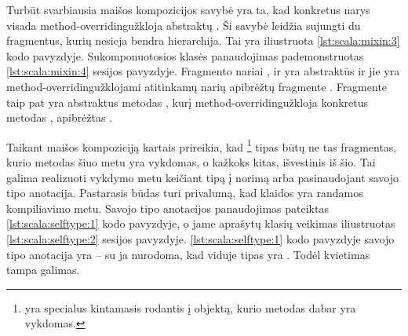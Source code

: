 
Turbūt svarbiausia maišos kompozicijos savybė yra ta, kad konkretus
narys visada \gls{method-overriding}{užkloja} abstraktų
\cite[6]{scalable-component-abstractions}. Ši savybė leidžia
sujungti du fragmentus, kurių nesieja bendra hierarchija. Tai yra
iliustruota \ref{lst:scala:mixin:3} kodo pavyzdyje.
Sukomponuotosios klasės  panaudojimas
pademonstruotas \ref{lst:scala:mixin:4}  sesijos
pavyzdyje. Fragmento  nariai
,  ir  yra abstraktūs
ir jie yra \gls{method-overriding}{užklojami} atitinkamų narių
apibrėžtų fragmente . Fragmente 
taip pat yra abstraktus metodas , kurį
\gls{method-overriding}{užkloja} konkretus metodas ,
apibrėžtas .


Taikant maišos kompoziciją kartais prireikia, kad
\footnote{ yra specialus kintamasis rodantis į
objektą, kurio metodas dabar yra vykdomas.} tipas būtų ne tas fragmentas,
kurio metodas šiuo metu yra vykdomas, o kažkoks kitas, išvestinis
iš šio. Tai galima realizuoti vykdymo metu keičiant 
tipą į norimą arba pasinaudojant  savojo tipo
anotacija. Pastarasis būdas turi privalumą, kad klaidos yra randamos
kompiliavimo metu. Savojo tipo anotacijos panaudojimas pateiktas
\ref{lst:scala:selftype:1} kodo pavyzdyje, o jame aprašytų klasių
veikimas iliustruotas \ref{lst:scala:selftype:2} 
sesijos pavyzdyje. \ref{lst:scala:selftype:1} kodo pavyzdyje savojo tipo
anotacija yra  – su ja nurodoma, kad
 viduje  tipas yra . Todėl
kvietimas  tampa galimas.


